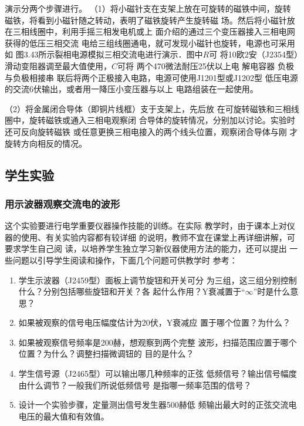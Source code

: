 演示分两个步骤进行。
（1）将小磁针支在支架上放在可旋转的磁铁中间，旋转
磁铁，将看到小磁针随之转动，表明了磁铁旋转产生旋转磁
场。然后将小磁针放在三相线圈中，利用手摇三相发电机或上
面介绍的通过三个变压器接入三相电网获得的低压三相交流
电给三组线圈通电，就可发现小磁针也旋转，电源也可采用如
图3.43所示裂相电源模拟三相交流电进行演示．图中$R$可
将10欧2安（J2354型）滑动变阻器调至最大值使用，$C$可将
两个470微法耐压25伏以上电 解电容器 负极与负极相接串
联后将两个正极接入电路，电源可使用J1201型或J1202型
低压电源的交流6伏输出，或者用一降压小变压器与以上
电路组装在一起使用。

（2）将金属闭合导体（即铜片线框）支于支架上，先后放
在可旋转磁铁和三相线圈中，旋转磁铁或通入三相电观察闭
合导体的旋转情况，分别加以讨论。实验时还可反向旋转磁铁
或任意更换三相电接入的两个线头位置，观察闭合导体与刚
才旋转方向相反的情况。

\subsection{学生实验}
\subsubsection{用示波器观察交流电的波形}
这个实验要进行电学重要仪器操作技能的训练。在实际
教学时，由于课本上对仪器的使用、有关实验内容都有较详细
的说明，教师不宜在课堂上再详细讲解，可要求学生自己阅
读，以培养学生独立学习新仪器使用方法的能力，还可以提出
一些问题以引导学生阅读和操作，下面几个问题可供教学时
参考：
\begin{enumerate}
\item 学生示波器（J2459型）面板上调节旋钮和开关可分
为三组，这三组分别控制什么？分别包括哪些旋钮和开关？各
起什么作用？Y衰减置于“$\infty$”时是什么意思？
\item 如果被观察的信号电压幅度估计为20伏，Y衰减应
置于哪个位置？为什么？
\item 如果被观察信号频率是200赫，想观察到两个完整
波形，扫描范围应置于哪个位置？为什么？调整扫描微调钮的
目的是什么？
\item 学生信号源（J2465型）可以输出哪几种频率的正弦
低频信号？输出信号幅度由什么调节？一般我们所说低频信号
是指哪一频率范围的信号？
\item 设计一个实验步骤，定量测出信号发生器500赫低
频输出最大时的正弦交流电电压的最大值和有效值。
\end{enumerate}

